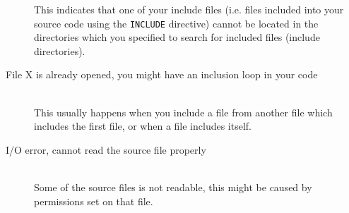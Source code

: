\begin{description}
            This indicates that one of your include files (i.e. files included into your source code using the \texttt{INCLUDE} directive) cannot be located in the directories which you specified to search for included files (include directories).
        \item[File X is already opened, you might have an inclusion loop in your code]~\\
            This usually happens when you include a file from another file which includes the first file, or when a file includes itself.
        \item[I/O error, cannot read the source file properly]~\\
            Some of the source files is not readable, this might be caused by permissions set on that file.
    \end{description}
